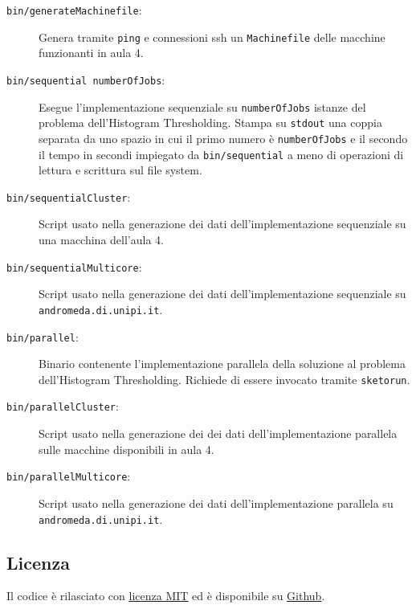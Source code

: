 \documentclass[12pt]{article}
\begin{document}
      \begin{description}
	\item[\texttt{bin/generateMachinefile}:] Genera tramite \texttt{ping} e
	  connessioni ssh un \texttt{Machinefile} delle macchine funzionanti in
	  aula 4.
        \item[\texttt{bin/sequential numberOfJobs}:] Esegue l'implementazione
	  sequenziale su \texttt{numberOfJobs} istanze del problema dell'Histogram
          Thresholding. Stampa su \texttt{stdout} una coppia separata da uno
          spazio in cui il primo numero \`e \texttt{numberOfJobs} e il secondo
          il tempo in secondi impiegato da \texttt{bin/sequential} a meno di
          operazioni di lettura e scrittura sul file system. 
	\item[\texttt{bin/sequentialCluster}:] Script usato nella generazione
	  dei dati dell'implementazione sequenziale su una macchina dell'aula 4.
	\item[\texttt{bin/sequentialMulticore}:] Script usato nella generazione
	  dei dati dell'implementazione sequenziale su \texttt{andromeda.di.unipi.it}.
	\item[\texttt{bin/parallel}:] Binario contenente l'implementazione parallela
	  della soluzione al problema dell'Histogram Thresholding. Richiede di essere
	  invocato tramite \texttt{sketorun}.
	\item[\texttt{bin/parallelCluster}:] Script usato nella generazione dei
	  dei dati dell'implementazione parallela sulle macchine disponibili in aula 4.
	\item[\texttt{bin/parallelMulticore}:] Script usato nella generazione dei
	  dati dell'implementazione parallela su \texttt{andromeda.di.unipi.it}.
      \end{description}

      \subsection{Licenza}

      Il codice \`e rilasciato con \href{http://opensource.org/licenses/MIT}{\underline{licenza MIT}}
      ed \`e disponibile su \href{https://github.com/jacquerie/SPM}{\underline{Github}}.
\end{document}
